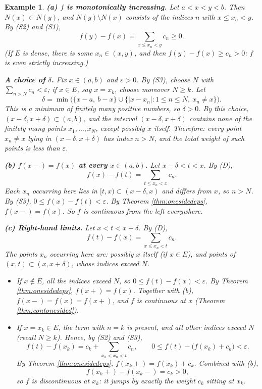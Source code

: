 \documentclass{article}
\theoremstyle{mythm}
\newtheorem{example}[theorem]{Example}
\begin{document}
\begin{example}
\textbf{(a) $f$ is monotonically increasing.} Let $a < x < y < b$. Then $N(x) \subset N(y)$, and $N(y) \setminus N(x)$ consists of the indices $n$ with $x \leq x_n < y$. By (S2) and (S1),
\[
f(y) - f(x) = \sum_{x \leq x_n < y} c_n \geq 0. \tag{D}
\]
(If $E$ is dense, there is some $x_n \in (x,y)$, and then $f(y) - f(x) \geq c_n > 0$: $f$ is even strictly increasing.)

\textbf{A choice of $\delta$.} Fix $x \in (a,b)$ and $\varepsilon > 0$. By (S3), choose $N$ with $\sum_{n>N} c_n < \varepsilon$; if $x \in E$, say $x = x_k$, choose moreover $N \geq k$. Let
\[
\delta = \min\big( \{x - a,\ b - x\} \cup \{ |x - x_n| : 1 \leq n \leq N,\ x_n \neq x \} \big).
\]
This is a minimum of finitely many positive numbers, so $\delta > 0$. By this choice, $(x - \delta, x + \delta) \subset (a,b)$, and the interval $(x - \delta, x + \delta)$ contains \textit{none} of the finitely many points $x_1, \dots, x_N$, except possibly $x$ itself. Therefore: \textit{every point $x_n \neq x$ lying in $(x-\delta, x+\delta)$ has index $n > N$}, and the total weight of such points is less than $\varepsilon$.

\textbf{(b) $f(x-) = f(x)$ at every $x \in (a,b)$.} Let $x - \delta < t < x$. By (D),
\[
f(x) - f(t) = \sum_{t \leq x_n < x} c_n.
\]
Each $x_n$ occurring here lies in $[t, x) \subset (x - \delta, x)$ and differs from $x$, so $n > N$. By (S3), $0 \leq f(x) - f(t) < \varepsilon$. By Theorem \ref{thm:onesidedeps}, $f(x-) = f(x)$. So $f$ is continuous from the left everywhere.

\textbf{(c) Right-hand limits.} Let $x < t < x + \delta$. By (D),
\[
f(t) - f(x) = \sum_{x \leq x_n < t} c_n.
\]
The points $x_n$ occurring here are: possibly $x$ itself (if $x \in E$), and points of $(x, t) \subset (x, x+\delta)$, whose indices exceed $N$.
\begin{itemize}
    \item \textit{If $x \notin E$}, all the indices exceed $N$, so $0 \leq f(t) - f(x) < \varepsilon$. By Theorem \ref{thm:onesidedeps}, $f(x+) = f(x)$. Together with (b), $f(x-) = f(x) = f(x+)$, and $f$ is \textit{continuous at $x$} (Theorem \ref{thm:contonesided}).
    \item \textit{If $x = x_k \in E$}, the term with $n = k$ is present, and all other indices exceed $N$ (recall $N \geq k$). Hence, by (S2) and (S3),
    \[
    f(t) - f(x_k) = c_k + \sum_{x_k < x_n < t} c_n, \qquad 0 \leq f(t) - \big(f(x_k) + c_k\big) < \varepsilon.
    \]
    By Theorem \ref{thm:onesidedeps}, $f(x_k+) = f(x_k) + c_k$. Combined with (b),
    \[
    f(x_k+) - f(x_k-) = c_k > 0,
    \]
    so $f$ is \textit{discontinuous at $x_k$}: it jumps by exactly the weight $c_k$ sitting at $x_k$.
\end{itemize}


\end{example}
\end{document}
